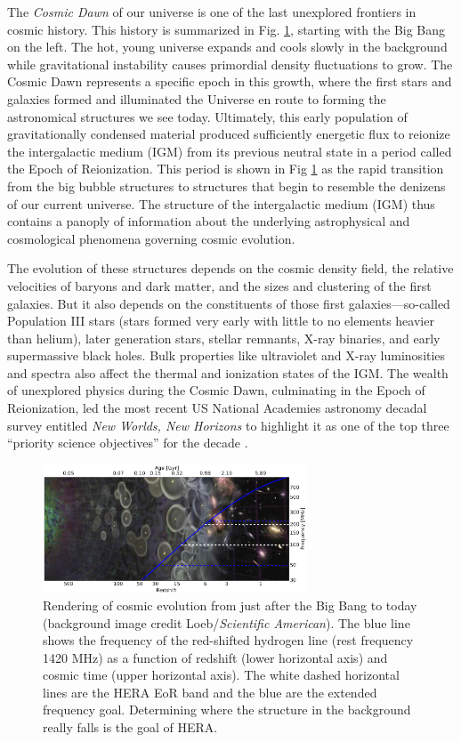 \documentclass[preprint,11pt]{aastex}
\begin{document}
The {\it Cosmic Dawn} of our universe is one of the last unexplored
frontiers in cosmic history.  This history is summarized in Fig. \ref{fig:cosmos}, starting with the Big Bang on the left. The hot, young universe expands and cools slowly in the background while gravitational instability causes primordial density fluctuations to grow.
The Cosmic Dawn represents a specific epoch in this growth, where the first stars and galaxies formed and illuminated the Universe en route to forming the astronomical structures we see today. Ultimately, this early population of gravitationally condensed material produced sufficiently energetic flux to reionize the intergalactic medium (IGM) from its previous neutral state in a period called the Epoch of Reionization.  This period is shown in Fig \ref{fig:cosmos} as the rapid transition from the big bubble structures to structures that begin to resemble the denizens of our current universe. The structure of the 
intergalactic medium (IGM) thus contains a panoply of information about the underlying astrophysical and cosmological phenomena governing cosmic evolution.

The evolution of these structures depends on the cosmic density field, the relative velocities of
baryons and dark matter, and the sizes and clustering of the first galaxies.
But it also depends on the constituents of those first galaxies---so-called Population
III stars (stars formed very early with little to no elements heavier than helium), later generation stars, stellar remnants, X-ray binaries,
and early supermassive black holes.  Bulk properties like
ultraviolet and X-ray luminosities and spectra also affect the thermal and
ionization states of the IGM.  The wealth of unexplored physics during the Cosmic Dawn,
culminating in the Epoch of Reionization, 
led the most recent US National Academies astronomy decadal survey entitled {\em New Worlds, New Horizons} to highlight it as one of the top three ``priority science objectives'' for
the decade \citep{NWNH}.

\begin{figure}[h!]
	\centering
	\includegraphics[width=0.7\textwidth]{plots/cosmicEvo.png}
	\caption{Rendering of cosmic evolution from just after the Big Bang to today (background image credit Loeb/{\em Scientific American}).  The blue line shows the frequency of the red-shifted hydrogen line (rest frequency 1420 MHz) as a function of redshift (lower horizontal axis) and cosmic time (upper horizontal axis).  The white dashed horizontal lines are the HERA EoR band and the blue are the extended frequency goal.  Determining where the structure in the background really falls is the
goal of HERA.} 
	\label{fig:cosmos}
\end{figure}
\end{document}
